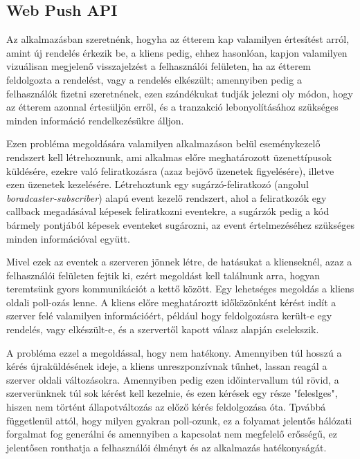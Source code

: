 \subsection{Web Push API}

Az alkalmazásban szeretnénk, hogyha az étterem kap valamilyen értesítést arról, amint új rendelés érkezik be, a kliens pedig, ehhez hasonlóan, kapjon valamilyen vizuálisan megjelenő visszajelzést a felhasználói felületen, ha az étterem feldolgozta a rendelést, vagy a rendelés elkészült; amennyiben pedig a felhasználók fizetni szeretnének, ezen szándékukat tudják jelezni oly módon, hogy az étterem azonnal értesüljön erről, és a tranzakció lebonyolításához szükséges minden információ rendelkezésükre álljon. \par

Ezen probléma megoldására valamilyen alkalmazáson belül eseménykezelő rendszert kell létrehoznunk, ami alkalmas előre meghatározott üzenettípusok küldésére, ezekre való feliratkozásra (azaz bejövő üzenetek figyelésére), illetve ezen üzenetek kezelésére. Létrehoztunk egy sugárzó-feliratkozó (angolul \emph{boradcaster-subscriber}) alapú event kezelő rendszert, ahol a feliratkozók egy callback megadásával képesek feliratkozni eventekre, a sugárzók pedig a kód bármely pontjából képesek eventeket sugározni, az event értelmezéséhez szükséges minden információval együtt. \par

Mivel ezek az eventek a szerveren jönnek létre, de hatásukat a klienseknél, azaz a felhasználói felületen fejtik ki, ezért megoldást kell találnunk arra, hogyan teremtsünk gyors kommunikációt a kettő között. Egy lehetséges megoldás a kliens oldali poll-ozás lenne. A kliens előre meghatároztt időközönként kérést indít a szerver felé valamilyen információért, például hogy feldolgozásra került-e egy rendelés, vagy elkészült-e, és a szervertől kapott válasz alapján cselekszik.

A probléma ezzel a megoldással, hogy nem hatékony. Amennyiben túl hosszú a kérés újraküldésének ideje, a kliens unreszponzívnak tűnhet, lassan reagál a szerver oldali változásokra. Amennyiben pedig ezen időintervallum túl rövid, a szerverünknek túl sok kérést kell kezelnie, és ezen kérések egy része "feleslges", hiszen nem történt állapotváltozás az előző kérés feldolgozása óta. Tpvábbá függetlenül attól, hogy milyen gyakran poll-ozunk, ez a folyamat jelentős hálózati forgalmat fog generálni és amennyiben a kapcsolat nem megfelelő erősségű, ez jelentősen ronthatja a felhasználói élményt és az alkalmazás hatékonyságát. \par

